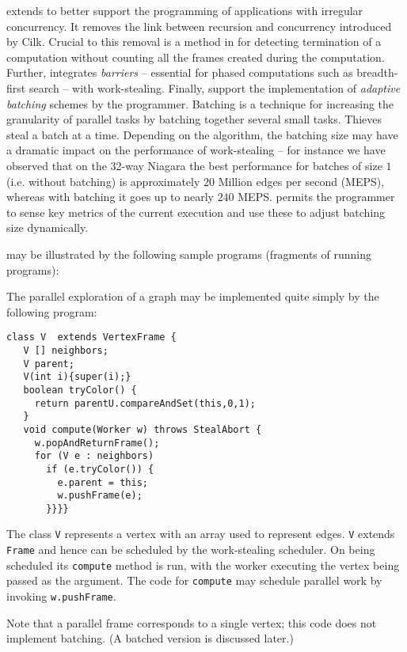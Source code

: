 \XWS{} extends \CWS{} to better support the programming of
applications with irregular concurrency. It removes the link between
recursion and concurrency introduced by Cilk. Crucial to this removal
is a method in \XWS{} for detecting termination of a computation
without counting all the frames created during the computation.
Further, \XWS{} integrates {\em barriers} -- essential for phased
computations such as breadth-first search -- with
work-stealing. Finally, \XWS{} support the implementation of {\em
adaptive batching} schemes by the programmer. Batching is a technique
for increasing the granularity of parallel tasks by batching together
several small tasks. Thieves steal a batch at a time. Depending on the
algorithm, the batching size may have a dramatic impact on the
performance of work-stealing -- for instance we have observed that on
the 32-way Niagara the best performance for batches of size $1$
(i.e.{} without batching) is approximately $20$ Million edges per
second (MEPS), whereas with batching it goes up to nearly $240$ MEPS.
\XWS{} permits the programmer to sense key metrics of the current
execution and use these to adjust batching size dynamically.

\XWS{} may be illustrated by the following sample programs (fragments
of running programs):

\begin{example} \label{example:dfs}
The parallel exploration of a graph may be implemented quite simply by the following program:
{\footnotesize
\begin{verbatim}
class V  extends VertexFrame {
   V [] neighbors;
   V parent;
   V(int i){super(i);}
   boolean tryColor() {
     return parentU.compareAndSet(this,0,1);
   }
   void compute(Worker w) throws StealAbort {
     w.popAndReturnFrame();
     for (V e : neighbors) 
       if (e.tryColor()) {
         e.parent = this;
         w.pushFrame(e);
       }}}}
\end{verbatim}}
The class {\tt V} represents a vertex with an array used to represent
edges. {\tt V} extends {\tt Frame} and hence can be scheduled by the
work-stealing scheduler. On being scheduled its {\tt compute} method
is run, with the worker executing the vertex being passed as the
argument. The code for {\tt compute} may schedule parallel work by
invoking {\tt w.pushFrame}. 

Note that a parallel frame corresponds to a single vertex; this code
does not implement batching. (A batched version is discussed later.)
\end{example}

